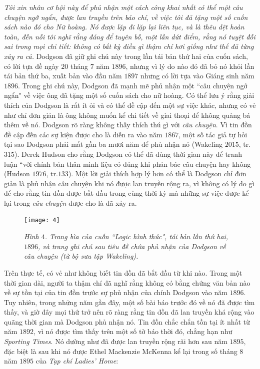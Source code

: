 \begin{multicols}{2}
	\vskip 0.1cm
	\textit{Tôi xin nhân cơ hội này để phủ nhận một cách công khai nhất  có thể  một câu chuyện ngớ ngẩn, được lan truyền trên báo chí, về việc tôi đã tặng một số cuốn sách nào đó cho Nữ hoàng. Nó được lặp đi lặp lại liên tục, và là thêu dệt hoàn toàn, đến nỗi tôi nghĩ rằng đáng để tuyên bố, một lần dứt điểm, rằng nó tuyệt đối sai trong mọi chi tiết: không có bất kỳ điều gì thậm chí hơi giống như thế đã từng xảy ra cả.}
	\vskip 0.1cm
	Dodgson đã giữ ghi chú này trong lần tái bản thứ hai của cuốn sách, có lời tựa đề ngày $20$ tháng $7$ năm $1896$, nhưng vì lý do nào đó đã bỏ nó khỏi lần tái bản thứ ba, xuất bản vào đầu năm $1897$ nhưng có lời tựa vào Giáng sinh năm $1896$.
	\vskip 0.1cm
	Trong ghi chú này, Dodgson đã mạnh mẽ phủ nhận một ``câu chuyện ngớ ngẩn" về việc ông đã tặng một số cuốn sách cho nữ hoàng. Có thể lưu ý rằng giải thích của Dodgson là rất ít ỏi và có thể đề cập đến một sự việc khác, nhưng có vẻ như chỉ đơn giản là ông không muốn kể chi tiết về giai thoại để không quảng bá thêm về nó. Dodgson rõ ràng không thấy thích thú gì với \textit{câu chuyện}. Vì tin đồn đề cập đến các sự kiện được cho là diễn ra vào năm $1867$, một số tác giả tự hỏi tại sao Dodgson phải mất gần ba mươi năm để phủ nhận nó (Wakeling $2015$, tr. $315$). Derek Hudson cho rằng Dodgson có thể đã dùng thời gian này để tranh luận ``với chính bản thân mình liệu có đúng khi phản bác câu chuyện hay không (Hudson $1976$,  tr.$133$). Một lời giải thích hợp lý hơn có thể là Dodgson chỉ đơn giản là phủ nhận câu chuyện khi nó được lan truyền rộng ra, vì không có lý do gì để cho rằng tin đồn được bắt đầu trong cùng thời kỳ mà những sự việc được kể lại trong \textit{câu chuyện} được cho là đã xảy ra.
	\begin{figure}[H]
		\vspace*{-5pt}
		\centering
		\captionsetup{labelformat= empty, justification=centering}
		\texttt{[image: 4]}
		\caption{\small\textit{\color{quantoan}Hình $4$. Trang bìa của cuốn ``Logic hình thức", tái bản lần thứ hai, $1896$, và trang ghi chú sau tiêu đề chứa phủ nhận của Dodgson về câu chuyện (từ bộ sưu tập Wakeling).}}
		\vspace*{-10pt}
	\end{figure}
	Trên thực tế, có vẻ như không biết tin đồn đã bắt đầu từ khi nào. Trong một thời gian dài, người ta thậm chí đã nghĩ rằng không có bằng chứng văn bản nào về sự tồn tại của tin đồn trước sự phủ nhận của chính Dodgson vào năm $1896$. Tuy nhiên, trong những năm gần đây, một số bài báo trước đó về nó đã được tìm thấy, và giờ đây mọi thứ trở nên rõ ràng rằng tin đồn đã lan truyền khá rộng vào quãng thời gian mà Dodgson phủ nhận nó. Tin đồn chắc chắn tồn tại ít nhất từ năm $1892$, vì nó được tìm thấy trên một số tờ báo thời đó, chẳng hạn như \textit{Sporting Times}. Nó dường như đã được lan truyền rộng rãi hơn sau năm $1895$, đặc biệt là sau khi nó được Ethel Mackenzie McKenna kể lại trong số tháng $8$ năm $1895$ của \textit{Tạp chí Ladies’ Home}:

\end{multicols}
